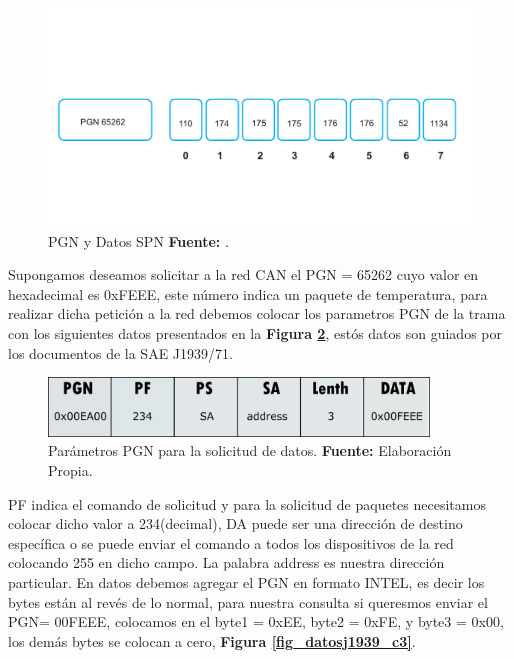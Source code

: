 \begin{figure}[H]
	\centering
	\includegraphics[width=1\textwidth]{./Cap5imagen/PGNEJEM.pdf}
	\caption[PGN y Datos SPN.]{PGN y Datos SPN\textbf{ Fuente:} \cite{MCmi}.}
	\label{TB3} %
\end{figure}

Supongamos deseamos solicitar a la red CAN el PGN = 65262 cuyo valor en hexadecimal es 0xFEEE, este número indica un paquete de temperatura, para realizar dicha petición a la red debemos colocar los parametros PGN  de la trama con los siguientes datos presentados en la \textbf{Figura \ref{fig_pgndatos_c3}}, estós datos son guiados por los documentos de la SAE J1939/71. 

    \begin{figure}[H]
		\centering
		\includegraphics[width=0.9\textwidth]{./Cap3imagen/pgndatos.pdf}
		\caption[Parámetros PGN para la solicitud de datos.]{Parámetros PGN para la solicitud de datos.\textbf{ Fuente:} %
		Elaboración Propia.}
		\label{fig_pgndatos_c3} %
	\end{figure}

PF  indica el comando de solicitud y para la solicitud de paquetes necesitamos colocar dicho valor a 234(decimal),   DA puede ser una dirección de destino específica o se puede enviar el comando a todos los dispositivos de la red colocando 255 en dicho campo. La palabra address es nuestra dirección particular. En datos debemos agregar el PGN en formato INTEL, es decir los bytes están al revés de lo normal,  para nuestra consulta si queresmos enviar el PGN= 00FEEE, colocamos en el byte1 = 0xEE, byte2 = 0xFE, y byte3  = 0x00, los demás bytes se colocan a cero, \textbf{Figura \ref{fig_datosj1939_c3}}.
    
